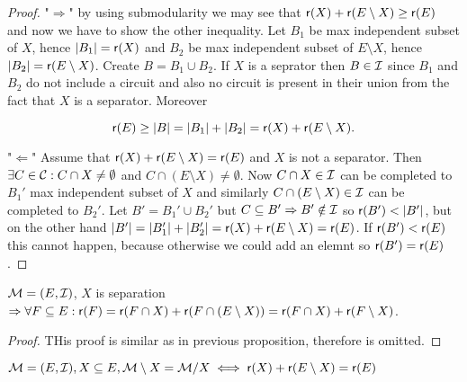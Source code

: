 \begin{proof}
	"$\Rightarrow$" by using submodularity we may see that $\operatorname{\mathsf{r}}(X) + \operatorname{\mathsf{r}}(E \setminus X) \geq \operatorname{\mathsf{r}}(E)$ and now we have to show the other inequality. Let $B_{1}$ be max independent subset of $X$, hence $|B_{1}| = \operatorname{\mathsf{r}}(X)$ and $B_{2}$ be max independent subset of $E \setminus X$, hence $|B_{2}| = \operatorname{\mathsf{r}}(E \setminus X)$. Create $B = B_{1} \cup B_{2}$. If $X$ is a seprator then $B \in \mathcal{I}$ since $B_{1}$ and $B_{2}$ do not include a circuit and also no circuit is present in their union from the fact that $X$ is a separator. Moreover

	$$
	\operatorname{\mathsf{r}}(E) \geq |B| = |B_{1}| + |B_{2}| = \operatorname{\mathsf{r}}(X) + \operatorname{\mathsf{r}}(E \setminus X).
	$$

	"$\Leftarrow$" Assume that $\operatorname{\mathsf{r}}(X) + \operatorname{\mathsf{r}}(E \setminus X) = \operatorname{\mathsf{r}}(E)$ and $X$ is not a separator. Then $\exists C \in \mathcal{C} : C \cap X \neq \emptyset$ and $C \cap (E \setminus X) \neq \emptyset$. Now $C \cap X \in \mathcal{I}$ can be completed to $B_{1}'$ max independent subset of $X$ and similarly $C \cap (E \setminus X) \in \mathcal{I}$ can be completed to $B_{2}'$. Let $B' = B_{1}' \cup B_{2}'$ but $C \subseteq B' \Rightarrow B' \notin \mathcal{I}$ so $\operatorname{\mathsf{r}}(B') < |B'|$, but on the other hand $|B'| = |B_{1}'| + |B_{2}'| = \operatorname{\mathsf{r}}(X) + \operatorname{\mathsf{r}}(E \setminus X) = \operatorname{\mathsf{r}}(E)$. If $\operatorname{\mathsf{r}}(B') < \operatorname{\mathsf{r}}(E)$ this cannot happen, because otherwise we could add an elemnt so $\operatorname{\mathsf{r}}(B') = \operatorname{\mathsf{r}}(E)$.
\end{proof}

\begin{prop}
	$\mathcal{M} = (E, \mathcal{I})$, $X$ is separation $\Rightarrow \forall F \subseteq E : \operatorname{\mathsf{r}}(F) = \operatorname{\mathsf{r}}(F \cap X) + \operatorname{\mathsf{r}}(F \cap (E \setminus X)) = \operatorname{\mathsf{r}}(F \cap X) + \operatorname{\mathsf{r}}(F \setminus X)$.
\end{prop}

\begin{proof}
	THis proof is similar as in previous proposition, therefore is omitted.
\end{proof}

\begin{prop}
	$\mathcal{M} = (E, \mathcal{I}), X \subseteq E, \mathcal{M} \setminus X = \mathcal{M} / X \iff \operatorname{\mathsf{r}}(X) + \operatorname{\mathsf{r}}(E \setminus X) = \operatorname{\mathsf{r}}(E)$
\end{prop}

